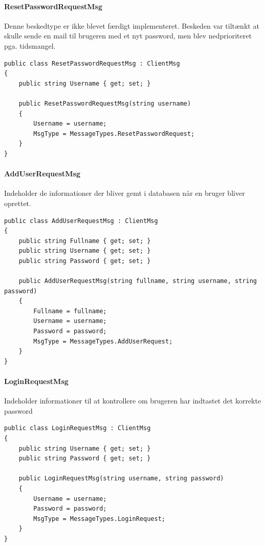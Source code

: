 \paragraph{ResetPasswordRequestMsg}
Denne beskedtype er ikke blevet færdigt implementeret. Beskeden var tiltænkt at skulle sende en mail til brugeren med et nyt password, men blev nedprioriteret pga. tidsmangel.
\begin{lstlisting}[caption=ResetPasswordRequestMsg, label=code:ResetPasswordRequestMsg]
public class ResetPasswordRequestMsg : ClientMsg
{
	public string Username { get; set; }
	
	public ResetPasswordRequestMsg(string username)
	{
		Username = username;
		MsgType = MessageTypes.ResetPasswordRequest;
	}
}
\end{lstlisting}

\paragraph{AddUserRequestMsg}
Indeholder de informationer der bliver gemt i databasen når en bruger bliver oprettet.
\begin{lstlisting}[caption=AddUserRequestMsg, label=code:AddUserRequestMsg]
public class AddUserRequestMsg : ClientMsg
{
	public string Fullname { get; set; }
	public string Username { get; set; }
	public string Password { get; set; }
	
	public AddUserRequestMsg(string fullname, string username, string password)
	{
		Fullname = fullname;
		Username = username;
		Password = password;
		MsgType = MessageTypes.AddUserRequest;
	}
}
\end{lstlisting}

\paragraph{LoginRequestMsg}
Indeholder informationer til at kontrollere om brugeren har indtastet det korrekte password
\begin{lstlisting}[caption=LoginRequestMsg, label=code:LoginRequestMsg]
public class LoginRequestMsg : ClientMsg
{
	public string Username { get; set; }
	public string Password { get; set; }
	
	public LoginRequestMsg(string username, string password)
	{
		Username = username;
		Password = password;
		MsgType = MessageTypes.LoginRequest;
	}
}
\end{lstlisting}

